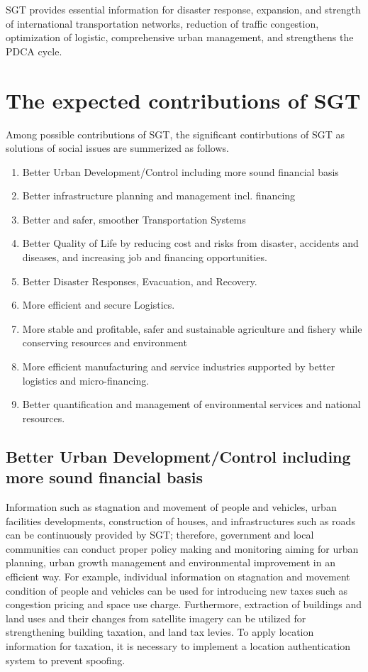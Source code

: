 \vspace{0.4 cm}

SGT provides essential information for disaster response, expansion, and strength of international transportation networks, reduction of traffic congestion, optimization of logistic, comprehensive urban management, and strengthens the PDCA cycle.

\section{The expected contributions of SGT}

Among possible contributions of SGT, the significant contirbutions of SGT as solutions of social issues are summerized as follows.

\begin{enumerate}

\item Better Urban Development/Control including more sound financial basis
\item Better infrastructure planning and management incl. financing \item Better and safer, smoother Transportation Systems
\item Better Quality of Life by reducing cost and risks from disaster, accidents and diseases, and increasing job and financing opportunities.
\item Better Disaster Responses, Evacuation, and Recovery.
\item More efficient and secure Logistics.
\item More stable and profitable, safer and sustainable agriculture and fishery while conserving resources and environment
\item More efficient manufacturing and service industries supported by better logistics and micro-financing.
\item Better quantification and management of environmental services and national resources.

\end{enumerate}

\subsection{Better Urban Development/Control including more sound financial basis}

\tab Information such as stagnation and movement of people and vehicles, urban facilities developments, construction of houses, and infrastructures such as roads can be continuously provided by SGT; therefore, government and local communities can conduct proper policy making and monitoring aiming for urban planning, urban growth management and environmental improvement in an efficient way. For example, individual information on stagnation and movement condition of people and vehicles can be used for introducing new taxes such as congestion pricing and space use charge. Furthermore, extraction of buildings and land uses and their changes from satellite imagery can be utilized for strengthening building taxation, and land tax levies. To apply location information for taxation, it is necessary to implement a location authentication system to prevent spoofing.

